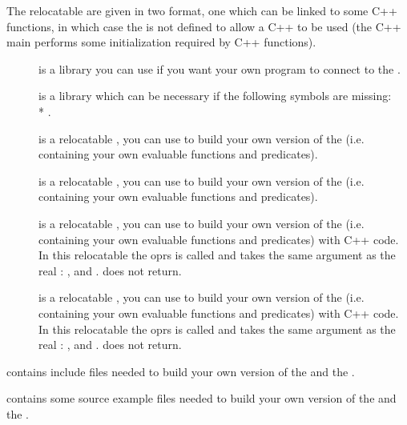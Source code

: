 \begin{description}
The relocatable are given in two format, one which can be linked to some C++
functions, in which case the  is not defined to allow a C++
 to be used (the C++ main performs some initialization required by
C++ functions).

\begin{description}

\item [] is a library you can use if you want your own program to
connect to the \MPA{}.

\item [] is a library which can be necessary if the following
symbols are missing: \\*
.

\item [] is a relocatable \CPK{},  you can use
to build your own version of the \CPK{} (i.e. containing your own evaluable
functions and predicates).

\item [] is a relocatable \XPK{},  you can use
to build your own version of the \XPK{} (i.e. containing your own evaluable
functions and predicates).

\item [] is a relocatable \CPK{},  you can use
to build your own version of the \CPK{} (i.e. containing your own evaluable
functions and predicates) with C++ code. In this relocatable the oprs
 is called  and takes the same argument as the real
: ,  and .  does not
return.

\item [] is a relocatable \XPK{}, you can use
to build your own version of the \XPK{} (i.e. containing your own evaluable
functions and predicates) with C++ code. In this relocatable the oprs
 is called  and takes the same argument as the real
: ,  and .  does not
return. 

\end{description}

\item [\file{include}] contains include files needed to build your own
version of the \XPK{} and the \CPK{}.

\item [\file{pub\_src}] contains some source example files needed to build your own
version of the \XPK{} and the \CPK{}.


\end{description}
